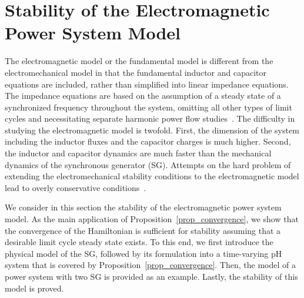 \section{Stability of the Electromagnetic Power System Model} \label{sec_stability}
The electromagnetic model or the fundamental model is different from the electromechanical model in that the fundamental inductor and capacitor equations are included, rather than simplified into linear impedance equations. The impedance equations are based on the assumption of a steady state of a synchronized frequency throughout the system, omitting all other types of limit cycles and necessitating separate harmonic power flow studies~\cite{xia1982harmonic}.
The difficulty in studying the electromagnetic model is twofold. First, the dimension of the system including the inductor fluxes and the capacitor charges is much higher. Second, the inductor and capacitor dynamics are much faster than the mechanical dynamics of the synchronous generator (SG). Attempts on the hard problem of extending the electromechanical stability conditions to the electromagnetic model lead to overly conservative conditions~\cite{gross2019effect,subotic2020lyapunov}. 

We consider in this section the stability of the electromagnetic power system model. As the main application of Proposition~\ref{prop_convergence}, we show that the convergence of the Hamiltonian is sufficient for stability assuming that a desirable limit cycle steady state exists. To this end, we first introduce the physical model of the SG, followed by its formulation into a time-varying pH system that is covered by Proposition~\ref{prop_convergence}. Then, the model of a power system with two SG is provided as an example. Lastly, the stability of this model is proved.













